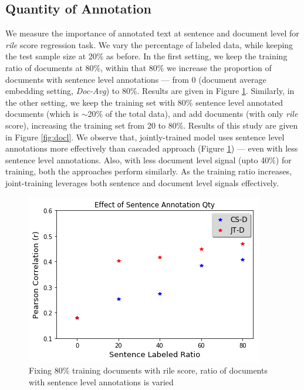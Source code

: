 \documentclass[11pt,a4paper]{article}
\begin{document}
\subsection{Quantity of Annotation}
We measure the importance of annotated text at sentence and document level for \textit{rile} score regression task. We vary the percentage of labeled data, while keeping the test sample size at 20\% as before. In the first setting, we keep the training ratio of documents at 80\%, within that 80\% we increase the proportion of documents with sentence level annotations --- from 0 (document average embedding setting, \textit{Doc-Avg}) to 80\%. Results are given in Figure \ref{fig:sentl}. Similarly, in the other setting, we keep the training set with 80\% sentence level annotated documents (which is $\sim$20\% of the total data), and add documents (with only \textit{rile} score), increasing the training set from 20 to 80\%. Results of this study are given in Figure \ref{fig:docl}. We observe that, jointly-trained model uses sentence level annotations more effectively than cascaded approach (Figure \ref{fig:sentl}) --- even with less sentence level annotations. Also, with less document level signal (upto 40\%) for training, both the approaches perform similarly. As the training ratio increases, joint-training leverages both sentence and document level signals effectively.

\begin{figure}[!ht]
\centering
  \includegraphics[width=0.9\linewidth]{Plot1.png}
  \caption{Fixing 80\% training documents with rile score, ratio of documents with sentence level annotations is varied}
  \label{fig:sentl}
\end{figure}
\end{document}
